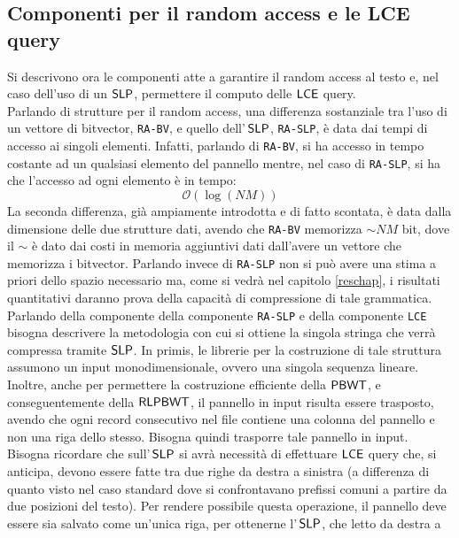 \subsection{Componenti per il random access e le LCE query}
Si descrivono ora le componenti atte a garantire il
random access
al testo e, nel caso dell'uso di un $\mbox{\rm {\sf SLP}}$, permettere il computo delle
$\mbox{\rm {\sf LCE}}$ query.\\
Parlando di strutture per il random access, una differenza sostanziale tra
l'uso di un vettore di bitvector, \texttt{RA-BV}, e quello
dell'$\,\mbox{\rm {\sf SLP}}$, \texttt{RA-SLP}, è data dai tempi di accesso ai singoli
elementi. Infatti, parlando di \texttt{RA-BV}, si ha accesso in tempo costante
ad un qualsiasi elemento del pannello mentre, nel caso di \texttt{RA-SLP}, si ha
che l'accesso ad ogni elemento è in tempo:
\begin{equation}
  \label{eq:timera}
  \mathcal{O}(\log (NM))
\end{equation}
La seconda differenza, già ampiamente introdotta e di fatto scontata, è data
dalla dimensione delle due strutture dati, avendo che \texttt{RA-BV} memorizza
$\sim NM$ bit, dove il $\sim$ è dato dai costi in memoria aggiuntivi dati
dall'avere un vettore che memorizza i bitvector. Parlando invece di
\texttt{RA-SLP} non si può avere una stima a priori dello spazio necessario ma,
come si vedrà nel capitolo \ref{reschap}, i risultati quantitativi daranno prova
della capacità di compressione di tale grammatica.\\
Parlando della componente della componente \texttt{RA-SLP} e della componente
\texttt{LCE} bisogna descrivere la metodologia con cui 
si ottiene la singola stringa che verrà compressa tramite $\mbox{\rm {\sf SLP}}$.
In primis, le
librerie per la costruzione di tale struttura assumono un input
monodimensionale, ovvero una singola sequenza lineare. Inoltre, anche per
permettere la costruzione efficiente della $\mbox{\rm {\sf PBWT}}$, e conseguentemente
della $\mbox{\rm {\sf RLPBWT}}$, il pannello in input risulta essere trasposto, avendo che
ogni record consecutivo nel file contiene una colonna del pannello e non una
riga dello stesso. Bisogna
quindi trasporre tale pannello in input. Bisogna ricordare che sull'$\,\mbox{\rm {\sf SLP}}$
si avrà  
necessità di effettuare $\mbox{\rm {\sf LCE}}$ query che, si anticipa, devono essere fatte tra
due righe da destra a sinistra (a differenza 
di quanto visto nel caso standard dove si confrontavano prefissi comuni a
partire da due posizioni del testo). Per
rendere possibile questa operazione, il pannello deve essere sia 
salvato come un'unica riga, per ottenerne l'$\,\mbox{\rm {\sf SLP}}$, che letto da destra a
